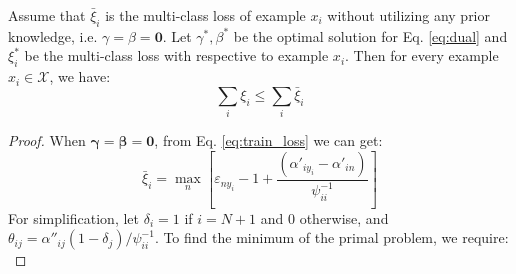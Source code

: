 
Assume that $\bar \xi_i$ is the multi-class loss of example $x_i$ without utilizing any prior knowledge, i.e. $\gamma=\beta = \mathbf{0}$. Let $\gamma^*, \beta^*$ be the optimal solution for Eq. \eqref{eq:dual} and $\xi_i^*$ be the multi-class loss with respective to example $x_i$. Then for every example $x_i \in \mathcal{X}$, we have:\[\sum\limits_i {{\xi _i}}  \le \sum\limits_i {{{\bar \xi }_i}} \]

\begin{proof}
When $\mathbf{\gamma}=\mathbf{\beta} = \mathbf{0}$, from Eq. \eqref{eq:train_loss} we can get:
\begin{equation*}
{\bar \xi _i} = \mathop {\max }\limits_n \left[ { {\varepsilon _{n{y_i}}}-1 + \frac{{\left( {{{\alpha '}_{i{y_i}}} - {{\alpha '}_{in}}} \right)}}{{\psi _{ii}^{ - 1}}}} \right]
\end{equation*}
For simplification, let $\delta_i=1$ if $i=N+1$ and 0 otherwise, and  ${\theta _{ij}} = {\alpha ''_{ij}}\left( {1 - {\delta _j}} \right)/\psi_{ii}^{ - 1}$.
To find the minimum of the primal problem, we require:
\begin{equation*}

\end{equation*}
\end{proof}

